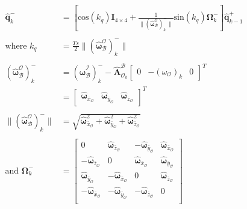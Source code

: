 \begin{equation}
\begin{aligned}
\hat{\mathbf{q}}_k^- &= \left[\text{cos}(k_q)\mathbf{I}_{4 \times 4} + \frac{1}{\lVert (\boldsymbol{\hat{\omega}}_{\mathcal{B}}^{\mathcal{O}})_k^- \rVert} \text{sin}(k_q) \mathbf{\Omega}_k^- \right] \hat{\mathbf{q}}_{k-1}^+ \\ \\
\text{where } k_q &= \frac{Ts}{2} \lVert (\boldsymbol{\hat{\omega}}_{\mathcal{B}}^{\mathcal{O}})_k^- \rVert \\ \\
(\boldsymbol{\hat{\omega}}_{\mathcal{B}}^{\mathcal{O}})_k^- &= (\boldsymbol{\hat{\omega}}_{\mathcal{B}}^{\mathcal{I}})_k^- - \boldsymbol{\hat{A}}^{\mathcal{B}}_{\mathcal{O}_k} \begin{bmatrix} 0 & -(\omega_\mathcal{O})_k & 0\end{bmatrix}^T \\
&= \begin{bmatrix} \boldsymbol{\hat{\omega}}_{\bar{x}_{\mathcal{O}}} & \boldsymbol{\hat{\omega}}_{\bar{y}_{\mathcal{O}}}  & \boldsymbol{\hat{\omega}}_{\bar{z}_{\mathcal{O}}} \end{bmatrix}^T \\ \\
\lVert (\boldsymbol{\hat{\omega}}_{\mathcal{B}}^{\mathcal{O}})_k^- \rVert &= \sqrt{\boldsymbol{\hat{\omega}}_{\bar{x}_{\mathcal{O}}}^2 + \boldsymbol{\hat{\omega}}_{\bar{y}_{\mathcal{O}}}^2 + \boldsymbol{\hat{\omega}}_{\bar{z}_{\mathcal{O}}}^2} \\ \\
\text{and } \mathbf{\Omega}_k^- &= \begin{bmatrix} 
0 & \boldsymbol{\hat{\omega}}_{\bar{z}_{\mathcal{O}}} & -\boldsymbol{\hat{\omega}}_{\bar{y}_{\mathcal{O}}} & \boldsymbol{\hat{\omega}}_{\bar{x}_{\mathcal{O}}} \\
-\boldsymbol{\hat{\omega}}_{\bar{z}_{\mathcal{O}}} & 0 & \boldsymbol{\hat{\omega}}_{\bar{x}_{\mathcal{O}}} & \boldsymbol{\hat{\omega}}_{\bar{y}_{\mathcal{O}}}			\\
\boldsymbol{\hat{\omega}}_{\bar{y}_{\mathcal{O}}} & -\boldsymbol{\hat{\omega}}_{\bar{x}_{\mathcal{O}}} & 0 & \boldsymbol{\hat{\omega}}_{\bar{z}_{\mathcal{O}}}			\\
-\boldsymbol{\hat{\omega}}_{\bar{x}_{\mathcal{O}}} & -\boldsymbol{\hat{\omega}}_{\bar{y}_{\mathcal{O}}} & -\boldsymbol{\hat{\omega}}_{\bar{z}_{\mathcal{O}}} & 0			\\
\end{bmatrix}
\end{aligned}
\label{eq:q-propagation}
\end{equation}

